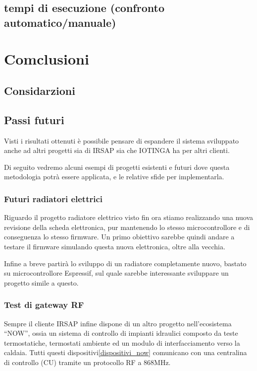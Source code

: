 \documentclass[a4paper,titlepage]{article}
\begin{document}
\subsection{tempi di esecuzione (confronto automatico/manuale)}

\section{Comclusioni}

\subsection{Considarzioni}

\subsection{Passi futuri}

Visti i risultati ottenuti è possibile pensare di espandere il sistema sviluppato
anche ad altri progetti sia di IRSAP sia che IOTINGA ha per altri clienti.

Di seguito vedremo alcuni esempi di progetti esistenti e futuri dove questa metodologia
potrà essere applicata, e le relative sfide per implementarla.

\subsubsection{Futuri radiatori elettrici}
Riguardo il progetto radiatore elettrico visto fin ora stiamo realizzando una nuova
revisione della scheda elettronica, pur mantenendo lo stesso microcontrollore e
di conseguenza lo stesso firmware. Un primo obiettivo sarebbe quindi andare a testare
il firmware simulando questa nuova elettronica, oltre alla vecchia.

Infine a breve partirà lo sviluppo di un radiatore completamente nuovo, bastato su
microcontrollore Espressif, sul quale sarebbe interessante sviluppare un progetto
simile a questo.

\subsubsection{Test di gateway RF}

Sempre il cliente IRSAP infine dispone di un altro progetto nell'ecosistema ``NOW'',
ossia un sistema di controllo di impianti idraulici composto da teste termostatiche,
termostati ambiente ed un modulo di interfacciamento verso la caldaia. Tutti questi
dispositivi\ref{dispositivi_now} comunicano con una centralina di controllo (CU) tramite un protocollo RF
a 868MHz.
\end{document}
